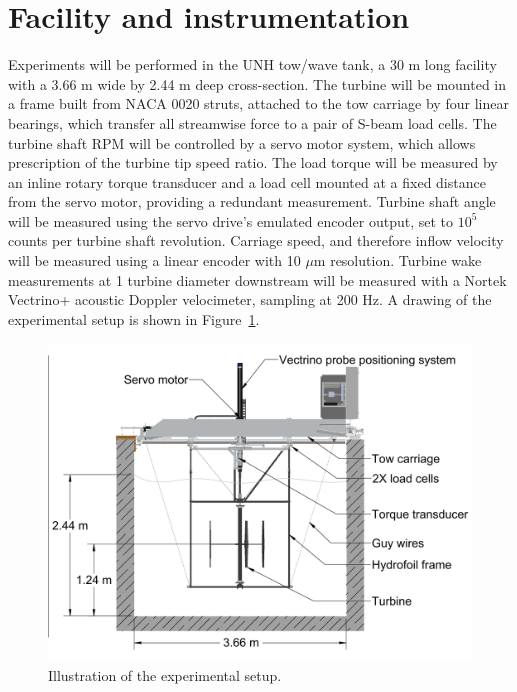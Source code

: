 \documentclass[14pt,letterpaper]{scrreprt}
\begin{document}
\section{Facility and instrumentation}

Experiments will be performed in the UNH tow/wave tank, a 30 m long facility
with a 3.66 m wide by 2.44 m deep cross-section. The turbine will be mounted in
a frame built from NACA 0020 struts, attached to the tow carriage by four linear
bearings, which transfer all streamwise force to a pair of S-beam load cells.
The turbine shaft RPM will be controlled by a servo motor system, which allows
prescription of the turbine tip speed ratio. The load torque will be measured by
an inline rotary torque transducer and a load cell mounted at a fixed distance
from the servo motor, providing a redundant measurement. Turbine shaft angle
will be measured using the servo drive's emulated encoder output, set to $10^5$
counts per turbine shaft revolution. Carriage speed, and therefore inflow
velocity will be measured using a linear encoder with 10 $\mu$m resolution.
Turbine wake measurements at 1 turbine diameter downstream will be measured with
a Nortek Vectrino+ acoustic Doppler velocimeter, sampling at 200 Hz. A drawing
of the experimental setup is shown in Figure~\ref{fig-exp_setup}.

\begin{figure}[ht]
\centering
\includegraphics[clip,trim=0.01in 0 0 0, width=\textwidth]{Figures/tank_cross_section}
\caption{Illustration of the experimental setup.}
\label{fig-exp_setup}
\end{figure}
\end{document}
